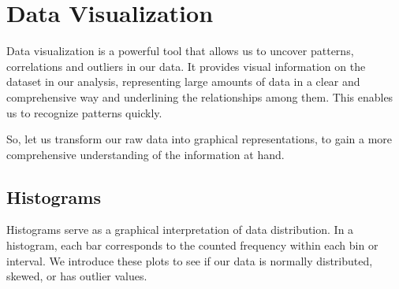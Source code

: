 \documentclass[
]{article}
\begin{document}
\section{Data Visualization}\label{data-visualization}

Data visualization is a powerful tool that allows us to uncover
patterns, correlations and outliers in our data. It provides visual
information on the dataset in our analysis, representing large amounts
of data in a clear and comprehensive way and underlining the
relationships among them. This enables us to recognize patterns quickly.

So, let us transform our raw data into graphical representations, to
gain a more comprehensive understanding of the information at hand.

\subsection{Histograms}\label{histograms}

Histograms serve as a graphical interpretation of data distribution. In
a histogram, each bar corresponds to the counted frequency within each
bin or interval. We introduce these plots to see if our data is normally
distributed, skewed, or has outlier values.
\end{document}
